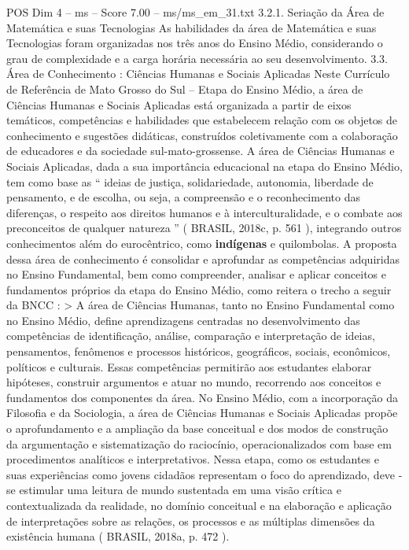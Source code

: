 \begin{textsample}{POS Dim 4 – ms – Score 7.00 – ms/ms\_em\_31.txt}  \label{ex:f4_pos_157}
3.2.1.
Seriação da Área de Matemática e suas Tecnologias As habilidades da área de Matemática e suas Tecnologias foram organizadas nos três anos do Ensino Médio, considerando o grau de complexidade e a carga horária necessária ao seu desenvolvimento. 3.3.
Área de Conhecimento : Ciências Humanas e Sociais Aplicadas Neste Currículo de Referência de Mato Grosso do Sul – Etapa do Ensino Médio, a área de Ciências Humanas e Sociais Aplicadas está organizada a partir de eixos temáticos, competências e habilidades que estabelecem relação com os objetos de conhecimento e sugestões didáticas, construídos coletivamente com a colaboração de educadores e da sociedade sul-mato-grossense.
A área de Ciências Humanas e Sociais Aplicadas, dada a sua importância educacional na etapa do Ensino Médio, tem como base as “ ideias de justiça, solidariedade, autonomia, liberdade de pensamento, e de escolha, ou seja, a compreensão e o reconhecimento das diferenças, o respeito aos direitos humanos e à interculturalidade, e o combate aos preconceitos de qualquer natureza ” ( BRASIL, 2018c, p. 561 ), integrando outros conhecimentos além do eurocêntrico, como \textbf{indígenas} e quilombolas.
A proposta dessa área de conhecimento é consolidar e aprofundar as competências adquiridas no Ensino Fundamental, bem como compreender, analisar e aplicar conceitos e fundamentos próprios da etapa do Ensino Médio, como reitera o trecho a seguir da BNCC : > A área de Ciências Humanas, tanto no Ensino Fundamental como no Ensino Médio, define aprendizagens centradas no desenvolvimento das competências de identificação, análise, comparação e interpretação de ideias, pensamentos, fenômenos e processos históricos, geográficos, sociais, econômicos, políticos e culturais.
Essas competências permitirão aos estudantes elaborar hipóteses, construir argumentos e atuar no mundo, recorrendo aos conceitos e fundamentos dos componentes da área.
No Ensino Médio, com a incorporação da Filosofia e da Sociologia, a área de Ciências Humanas e Sociais Aplicadas propõe o aprofundamento e a ampliação da base conceitual e dos modos de construção da argumentação e sistematização do raciocínio, operacionalizados com base em procedimentos analíticos e interpretativos.
Nessa etapa, como os estudantes e suas experiências como jovens cidadãos representam o foco do aprendizado, deve -se estimular uma leitura de mundo sustentada em uma visão crítica e contextualizada da realidade, no domínio conceitual e na elaboração e aplicação de interpretações sobre as relações, os processos e as múltiplas dimensões da existência humana ( BRASIL, 2018a, p. 472 ).

\end{textsample}
